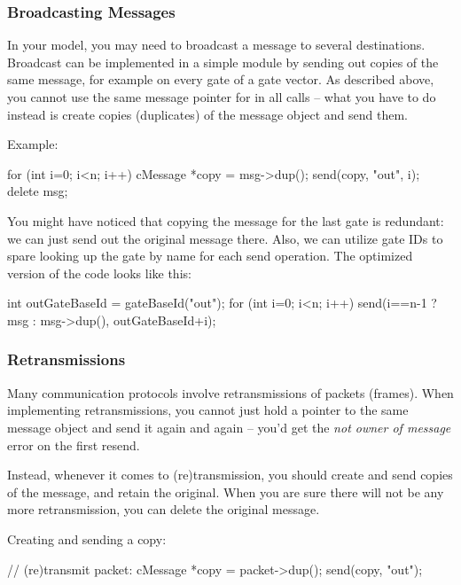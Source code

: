 \subsubsection{Broadcasting Messages}

In your model, you may need to broadcast a message to several destinations.
Broadcast can be implemented in a simple module by sending out copies
of the same message, for example on every gate of a gate vector.
As described above, you cannot use the same message pointer for
in all  calls -- what you have to do instead is
create copies (duplicates) of the message object and send them.

Example:

\begin{cpp}
for (int i=0; i<n; i++)
{
    cMessage *copy = msg->dup();
    send(copy, "out", i);
}
delete msg;
\end{cpp}

You might have noticed that copying the message for the last gate is
redundant: we can just send out the original message there.
Also, we can utilize gate IDs to spare looking up the gate by name
for each send operation. The optimized version of the code looks
like this:

\begin{cpp}
int outGateBaseId = gateBaseId("out");
for (int i=0; i<n; i++)
    send(i==n-1 ? msg : msg->dup(), outGateBaseId+i);
\end{cpp}


\subsubsection{Retransmissions}

Many communication protocols involve retransmissions of packets (frames).
When implementing retransmissions, you cannot just hold a pointer
to the same message object and send it again and again -- you'd get
the \textit{not owner of message} error on the first resend.

Instead, whenever it comes to (re)transmission, you should create and
send copies of the message, and retain the original.
When you are sure there will not be any more retransmission,
you can delete the original message.

Creating and sending a copy:

\begin{cpp}
// (re)transmit packet:
cMessage *copy = packet->dup();
send(copy, "out");
\end{cpp}

